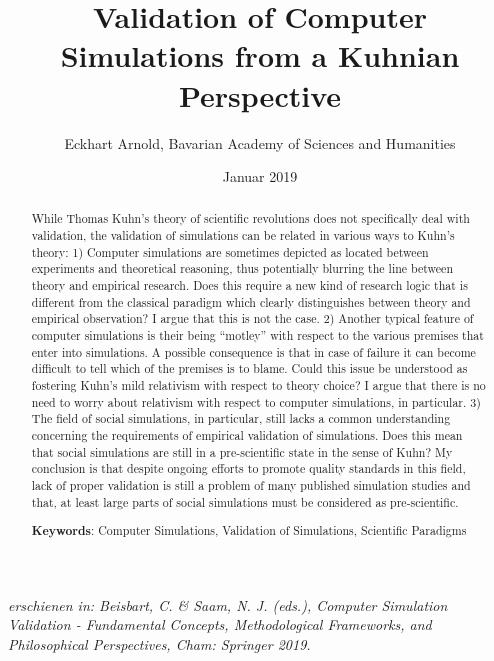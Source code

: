 \documentclass[12pt, a4paper]{article}
\begin{document}
\title{Validation of Computer Simulations from a Kuhnian Perspective}

\author{Eckhart Arnold, Bavarian Academy of Sciences and Humanities}

\date{Januar 2019}

\maketitle

\sloppy

\begin{center}
{\em erschienen in: Beisbart, C. \& Saam, N. J. (eds.), Computer
Simulation Validation  - Fundamental Concepts, Methodological
Frameworks, and Philosophical Perspectives, Cham: Springer 2019.}
\end{center}

\begin{abstract}
\singlespacing

While Thomas Kuhn's theory of scientific revolutions does not
specifically deal with validation, the validation of simulations can
be related in various ways to Kuhn's theory: 1) Computer simulations
are sometimes depicted as located between experiments and theoretical
reasoning, thus potentially blurring the line between theory and
empirical research. Does this require a new kind of research logic
that is different from the classical paradigm which clearly
distinguishes between theory and empirical observation? I argue that
this is not the case. 2) Another typical feature of computer
simulations is their being ``motley'' \citep{winsberg:2003} with
respect to the various premises that enter into simulations. A
possible consequence is that in case of failure it can become
difficult to tell which of the premises is to blame. Could this issue
be understood as fostering Kuhn's mild relativism with respect to
theory choice? I argue that there is no need to worry about relativism
with respect to computer simulations, in particular. 3) The field of
social simulations, in particular, still lacks a common understanding
concerning the requirements of empirical validation of simulations.
Does this mean that social simulations are still in a pre-scientific
state in the sense of Kuhn? My conclusion is that despite ongoing
efforts to promote quality standards in this field, lack of proper
validation is still a problem of many published simulation studies and
that, at least large parts of social simulations must be considered as
pre-scientific.


\begin{flushleft}
  {\bf Keywords}: Computer Simulations, Validation of Simulations,
  Scientific Paradigms
\end{flushleft}

\end{abstract}
\end{document}

